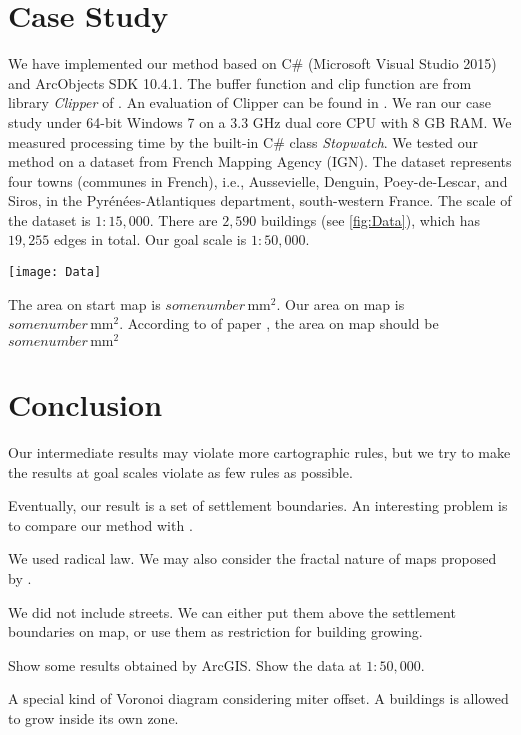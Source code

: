 \section{Case Study}
\label{sec:CaseStudy}
We have implemented our method based on
C\# (Microsoft Visual Studio 2015) and ArcObjects SDK 10.4.1.
The buffer function and clip function are from library \emph{Clipper} 
of \citet{Johnson2014}.
An evaluation of Clipper can be found in \citet{Palfrader2015}.
We ran our case study under 64-bit 
Windows 7 on a 3.3 GHz dual core CPU with 8 GB RAM.
We measured processing time by the built-in C\# class 
\emph{Stopwatch}.
We tested our method on a dataset from French Mapping Agency (IGN).
The dataset represents four towns (communes in French), i.e., Aussevielle, 
Denguin,  Poey-de-Lescar, and Siros, in the 
Pyr\'en\'ees-Atlantiques department, south-western France.
The scale of the dataset is $1:15{,}000$.
There are $2{,}590$ buildings (see \fig\ref{fig:Data}), 
which has $19{,}255$ edges in total.
Our goal scale is $1:50{,}000$.


\begin{figure*}[tb]
	\centering
	\texttt{[image: Data]}
	\caption{scale.}
	\label{fig:Data}
\end{figure*}



The area on start map is $some number\,\text{mm}^2$.
Our area on map is $some number\,\text{mm}^2$.
According to  of paper \citet{Topfer1966}, 
the area on map should be $some number\,\text{mm}^2$


\section{Conclusion}
\label{sec:Conclusion}


Our intermediate results may violate more cartographic rules, but we try to 
make the results at goal scales violate as few rules as possible.


Eventually, our result is a set of settlement boundaries. An interesting 
problem is to compare our method with \citet{Chaudhry2008}.

We used radical law. We may also consider the fractal nature of maps proposed 
by \citet{Jiang2015}.

We did not include streets. We can either put them above the settlement 
boundaries on map, or use them as restriction for building growing.

Show some results obtained by ArcGIS.
Show the data at $1:50{,}000$.

A special kind of Voronoi diagram considering miter offset. A buildings is 
allowed to grow inside its own zone.

